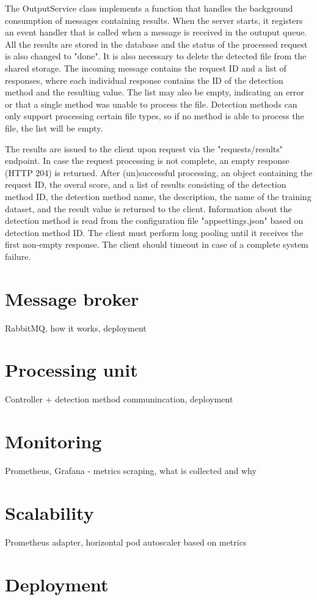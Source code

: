 The OutputService class implements a function that handles the background consumption of messages containing results. When the server starts, it registers an event handler that is called when a message is received in the outuput queue. All the results are stored in the database and the status of the processed request is also changed to "done". It is also necessary to delete the detected file from the shared storage. The incoming message contains the request ID and a list of responses, where each individual response contains the ID of the detection method and the resulting value. The list may also be empty, indicating an error or that a single method was unable to process the file. Detection methods can only support processing certain file types, so if no method is able to process the file, the list will be empty.

The results are issued to the client upon request via the "requests/results" endpoint. In case the request processing is not complete, an empty response (HTTP 204) is returned. After (un)successful processing, an object containing the request ID, the overal score, and a list of results consisting of the detection method ID, the detection method name, the description, the name of the training dataset, and the result value is returned to the client. Information about the detection method is read from the configuration file "appsettings.json" based on detection method ID. The client must perform long pooling until it receives the first non-empty response. The client should timeout in case of a complete system failure.

\section{Message broker}
RabbitMQ, how it works, deployment
\section{Processing unit}
Controller + detection method communincation, deployment
\section{Monitoring}
Prometheus, Grafana - metrics scraping, what is collected and why
\section{Scalability}
Prometheus adapter, horizontal pod autoscaler based on metrics
\section{Deployment}

